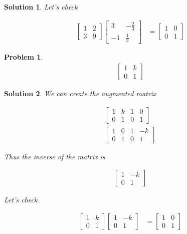 \documentclass{article}
\newtheorem{problem}{Problem}
\newtheorem*{solution}{Solution}
\begin{document}
\begin{solution}
Let's check

\begin{align*}
\begin{bmatrix}
1 & 2 \\ 3 & 9
\end{bmatrix}
\begin{bmatrix}
\displaystyle 3 & -\frac{2}{3} \\
\displaystyle -1 & \frac{1}{3}
\end{bmatrix}
&= 
\begin{bmatrix}
1 & 0 \\ 0 & 1
\end{bmatrix}
\end{align*}

\end{solution}

\begin{problem}
\begin{align*}
\begin{bmatrix}
1 & k \\ 0 & 1
\end{bmatrix}
\end{align*}
\end{problem}

\begin{solution}
We can create the augmented matrix

\begin{align*}
\begin{bmatrix}
1 & k & 1 & 0 \\ 0 & 1 & 0 & 1
\end{bmatrix} \\
\begin{bmatrix}
1 & 0 & 1 & -k \\ 0 & 1 & 0 & 1
\end{bmatrix}
\end{align*}

Thus the inverse of the matrix is 

\begin{align*}
\begin{bmatrix}
1 & -k \\ 0 & 1
\end{bmatrix}
\end{align*}

Let's check

\begin{align*}
\begin{bmatrix}
1 & k \\ 0 & 1
\end{bmatrix}
\begin{bmatrix}
1 & -k \\ 0 & 1
\end{bmatrix}
&= 
\begin{bmatrix}
1 & 0 \\ 0 & 1
\end{bmatrix}
\end{align*}

\end{solution}
\end{document}
